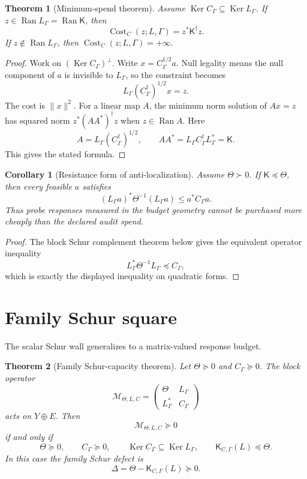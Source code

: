 \documentclass[11pt]{article}
\newtheorem{theorem}{Theorem}
\newtheorem{corollary}{Corollary}
\newcommand{\Ran}{\operatorname{Ran}}
\newcommand{\Ker}{\operatorname{Ker}}
\newcommand{\Cost}{\operatorname{Cost}}
\begin{document}
\begin{theorem}[Minimum-spend theorem]
Assume $\Ker C_\Gamma\subseteq\Ker L_\Gamma$.  If $z\in\Ran L_\Gamma=\Ran\mathsf K$, then
\[
        \boxed{
        \Cost_C(z;L,\Gamma)=z^*\mathsf K^\dagger z.
        }
\]
If $z\notin\Ran L_\Gamma$, then $\Cost_C(z;L,\Gamma)=+\infty$.
\end{theorem}

\begin{proof}
Work on $(\Ker C_\Gamma)^\perp$.  Write $x=C_\Gamma^{1/2}a$.  Null legality means the null component of $a$ is invisible to $L_\Gamma$, so the constraint becomes
\[
        L_\Gamma (C_\Gamma^\dagger)^{1/2}x=z.
\]
The cost is $\|x\|^2$.  For a linear map $A$, the minimum norm solution of $Ax=z$ has squared norm $z^*(AA^*)^\dagger z$ when $z\in\Ran A$.  Here
\[
        A=L_\Gamma (C_\Gamma^\dagger)^{1/2},
        \qquad AA^*=L_\Gamma C_\Gamma^\dagger L_\Gamma^*=\mathsf K.
\]
This gives the stated formula.
\end{proof}

\begin{corollary}[Resistance form of anti-localization]
Assume $\Theta\succ0$.  If $\mathsf K\preceq\Theta$, then every feasible $a$ satisfies
\[
        \boxed{
        (L_\Gamma a)^*\Theta^{-1}(L_\Gamma a)
        \le
        a^*C_\Gamma a.
        }
\]
Thus probe responses measured in the budget geometry cannot be purchased more cheaply than the declared audit spend.
\end{corollary}

\begin{proof}
The block Schur complement theorem below gives the equivalent operator inequality
\[
        L_\Gamma^*\Theta^{-1}L_\Gamma\preceq C_\Gamma,
\]
which is exactly the displayed inequality on quadratic forms.
\end{proof}

\section{Family Schur square}
The scalar Schur wall generalizes to a matrix-valued response budget.

\begin{theorem}[Family Schur-capacity theorem]
Let $\Theta\succeq0$ and $C_\Gamma\succeq0$.  The block operator
\[
        \mathcal M_{\Theta,L,C}
        =
        \begin{pmatrix}
        \Theta & L_\Gamma\\
        L_\Gamma^* & C_\Gamma
        \end{pmatrix}
\]
acts on $Y\oplus E$.  Then
\[
        \mathcal M_{\Theta,L,C}\succeq0
\]
if and only if
\[
        \Theta\succeq0,
        \qquad
        C_\Gamma\succeq0,
        \qquad
        \Ker C_\Gamma\subseteq\Ker L_\Gamma,
        \qquad
        \mathsf K_{C,\Gamma}(L)\preceq\Theta.
\]
In this case the family Schur defect is
\[
        \Delta=\Theta-\mathsf K_{C,\Gamma}(L)\succeq0.
\]
\end{theorem}
\end{document}
